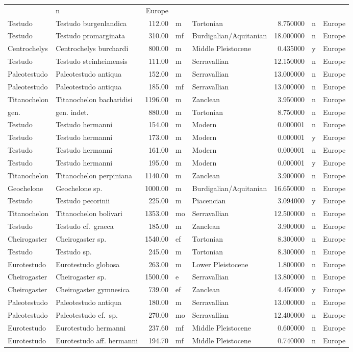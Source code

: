 \documentclass[]{article}
\begin{document}
\begin{longtable}[]{@{}llrllrll@{}}
& n & Europe\tabularnewline
Testudo & Testudo burgenlandica & 112.00 & m & Tortonian & 8.750000 & n
& Europe\tabularnewline
Testudo & Testudo promarginata & 310.00 & mf & Burdigalian/Aquitanian &
18.000000 & n & Europe\tabularnewline
Centrochelys & Centrochelys burchardi & 800.00 & m & Middle Pleistocene
& 0.435000 & y & Europe\tabularnewline
Testudo & Testudo steinheimensis & 111.00 & m & Serravallian & 12.150000
& n & Europe\tabularnewline
Paleotestudo & Paleotestudo antiqua & 152.00 & m & Serravallian &
13.000000 & n & Europe\tabularnewline
Paleotestudo & Paleotestudo antiqua & 185.00 & mf & Serravallian &
13.000000 & n & Europe\tabularnewline
Titanochelon & Titanochelon bacharidisi & 1196.00 & m & Zanclean &
3.950000 & n & Europe\tabularnewline
gen. & gen. indet. & 880.00 & m & Tortonian & 8.750000 & n &
Europe\tabularnewline
Testudo & Testudo hermanni & 154.00 & m & Modern & 0.000001 & n &
Europe\tabularnewline
Testudo & Testudo hermanni & 173.00 & m & Modern & 0.000001 & y &
Europe\tabularnewline
Testudo & Testudo hermanni & 161.00 & m & Modern & 0.000001 & n &
Europe\tabularnewline
Testudo & Testudo hermanni & 195.00 & m & Modern & 0.000001 & y &
Europe\tabularnewline
Titanochelon & Titanochelon perpiniana & 1140.00 & m & Zanclean &
3.900000 & n & Europe\tabularnewline
Geochelone & Geochelone sp. & 1000.00 & m & Burdigalian/Aquitanian &
16.650000 & n & Europe\tabularnewline
Testudo & Testudo pecorinii & 225.00 & m & Piacencian & 3.094000 & y &
Europe\tabularnewline
Titanochelon & Titanochelon bolivari & 1353.00 & mo & Serravallian &
12.500000 & n & Europe\tabularnewline
Testudo & Testudo cf.~graeca & 185.00 & m & Zanclean & 3.900000 & n &
Europe\tabularnewline
Cheirogaster & Cheirogaster sp. & 1540.00 & ef & Tortonian & 8.300000 &
n & Europe\tabularnewline
Testudo & Testudo sp. & 245.00 & m & Tortonian & 8.300000 & n &
Europe\tabularnewline
Eurotestudo & Eurotestudo globosa & 263.00 & m & Lower Pleistocene &
1.800000 & n & Europe\tabularnewline
Cheirogaster & Cheirogaster sp. & 1500.00 & e & Serravallian & 13.800000
& n & Europe\tabularnewline
Cheirogaster & Cheirogaster gymnesica & 739.00 & ef & Zanclean &
4.450000 & y & Europe\tabularnewline
Paleotestudo & Paleotestudo antiqua & 180.00 & m & Serravallian &
13.000000 & n & Europe\tabularnewline
Paleotestudo & Paleotestudo cf.~sp. & 270.00 & mo & Serravallian &
12.400000 & n & Europe\tabularnewline
Eurotestudo & Eurotestudo hermanni & 237.60 & mf & Middle Pleistocene &
0.600000 & n & Europe\tabularnewline
Eurotestudo & Eurotestudo aff. hermanni & 194.70 & mf & Middle
Pleistocene & 0.740000 & n & Europe\tabularnewline

\end{longtable}
\end{document}
